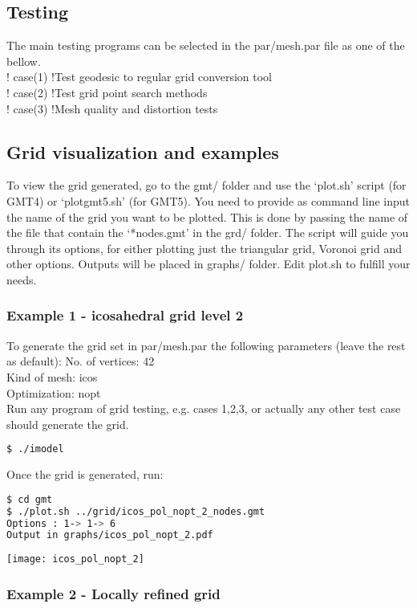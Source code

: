 \documentclass[a4paper,10pt]{article}
\begin{document}
\subsection{Testing}
The main testing programs can be selected in the par/mesh.par file as one of the bellow.\\
!  case(1) !Test geodesic to regular grid conversion tool\\
!  case(2) !Test grid point search methods\\
!  case(3) !Mesh quality and distortion tests\\


\subsection{Grid visualization and examples}

To view the grid generated, go to the gmt/ folder and use the `plot.sh' script (for GMT4) or `plot{\textunderscore}gmt5.sh' (for GMT5). You need to provide as command line input the name of the grid you want to be plotted. This is done by passing the name of the file that contain the `*nodes.gmt' in the grd/ folder. The script will guide you through its options, for either plotting just the triangular grid, Voronoi grid and other options. Outputs will be placed in graphs/ folder. Edit plot.sh to fulfill your needs.

\subsubsection{Example 1 - icosahedral grid level 2}
To generate the grid set in par/mesh.par the following parameters (leave the rest as default):
No. of vertices: 42 \\
Kind of mesh: icos \\
Optimization: nopt \\
Run any program of grid testing, e.g. cases 1,2,3, or actually any other test case should generate the grid.
\begin{lstlisting}[language=bash]
$ ./imodel
\end{lstlisting}
Once the grid is generated, run:
\begin{lstlisting}[language=bash]
$ cd gmt
$ ./plot.sh ../grid/icos_pol_nopt_2_nodes.gmt 
Options : 1-> 1-> 6
Output in graphs/icos_pol_nopt_2.pdf
\end{lstlisting}

\texttt{[image: icos\_pol\_nopt\_2]}

\subsubsection{Example 2 - Locally refined grid}
\end{document}
